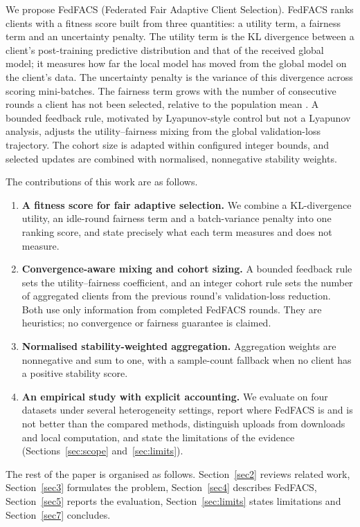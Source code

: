 \documentclass[pdflatex,sn-basic]{sn-jnl}
\begin{document}
We propose FedFACS (Federated Fair Adaptive Client Selection). FedFACS ranks clients with a fitness score built from three quantities: a utility term, a fairness term and an uncertainty penalty. The utility term is the KL divergence between a client's post-training predictive distribution and that of the received global model; it measures how far the local model has moved from the global model on the client's data. The uncertainty penalty is the variance of this divergence across scoring mini-batches. The fairness term grows with the number of consecutive rounds a client has not been selected, relative to the population mean \citep{shi2024,xu2024}. A bounded feedback rule, motivated by Lyapunov-style control \citep{chaudhari2002} but not a Lyapunov analysis, adjusts the utility--fairness mixing from the global validation-loss trajectory. The cohort size is adapted within configured integer bounds, and selected updates are combined with normalised, nonnegative stability weights.

The contributions of this work are as follows.
\begin{enumerate}
\item \textbf{A fitness score for fair adaptive selection.} We combine a KL-divergence utility, an idle-round fairness term and a batch-variance penalty into one ranking score, and state precisely what each term measures and does not measure.
\item \textbf{Convergence-aware mixing and cohort sizing.} A bounded feedback rule sets the utility--fairness coefficient, and an integer cohort rule sets the number of aggregated clients from the previous round's validation-loss reduction. Both use only information from completed FedFACS rounds. They are heuristics; no convergence or fairness guarantee is claimed.
\item \textbf{Normalised stability-weighted aggregation.} Aggregation weights are nonnegative and sum to one, with a sample-count fallback when no client has a positive stability score.
\item \textbf{An empirical study with explicit accounting.} We evaluate on four datasets under several heterogeneity settings, report where FedFACS is and is not better than the compared methods, distinguish uploads from downloads and local computation, and state the limitations of the evidence (Sections~\ref{sec:scope} and~\ref{sec:limits}).
\end{enumerate}

The rest of the paper is organised as follows. Section~\ref{sec2} reviews related work, Section~\ref{sec3} formulates the problem, Section~\ref{sec4} describes FedFACS, Section~\ref{sec5} reports the evaluation, Section~\ref{sec:limits} states limitations and Section~\ref{sec7} concludes.
\end{document}
